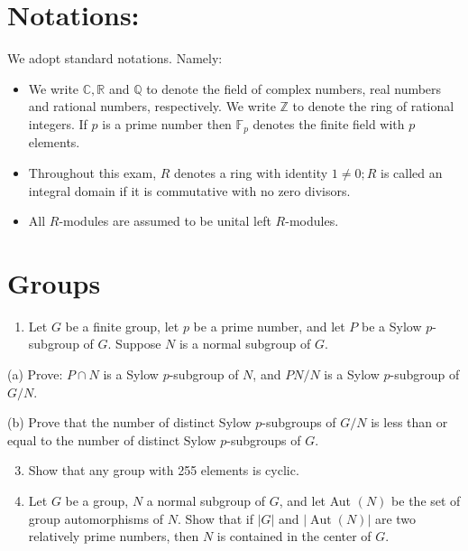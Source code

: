 \documentclass[10pt]{article}
\begin{document}
\section{Notations:}
We adopt standard notations. Namely:

\begin{itemize}
  \item We write $\mathbb{C}, \mathbb{R}$ and $\mathbb{Q}$ to denote the field of complex numbers, real numbers and rational numbers, respectively. We write $\mathbb{Z}$ to denote the ring of rational integers. If $p$ is a prime number then $\mathbb{F}_{p}$ denotes the finite field with $p$ elements.

  \item Throughout this exam, $R$ denotes a ring with identity $1 \neq 0 ; R$ is called an integral domain if it is commutative with no zero divisors.

  \item All $R$-modules are assumed to be unital left $R$-modules.

\end{itemize}
\section{Groups}
\begin{enumerate}
  \item Let $G$ be a finite group, let $p$ be a prime number, and let $P$ be a Sylow $p$-subgroup of $G$. Suppose $N$ is a normal subgroup of $G$.
\end{enumerate}
(a) Prove: $P \cap N$ is a Sylow $p$-subgroup of $N$, and $P N / N$ is a Sylow $p$-subgroup of $G / N$.

(b) Prove that the number of distinct Sylow $p$-subgroups of $G / N$ is less than or equal to the number of distinct Sylow $p$-subgroups of $G$.

\begin{enumerate}
  \setcounter{enumi}{2}
  \item Show that any group with 255 elements is cyclic.

  \item Let $G$ be a group, $N$ a normal subgroup of $G$, and let Aut $(N)$ be the set of group automorphisms of $N$. Show that if $|G|$ and $|\operatorname{Aut}(N)|$ are two relatively prime numbers, then $N$ is contained in the center of $G$.

\end{enumerate}
\end{document}
